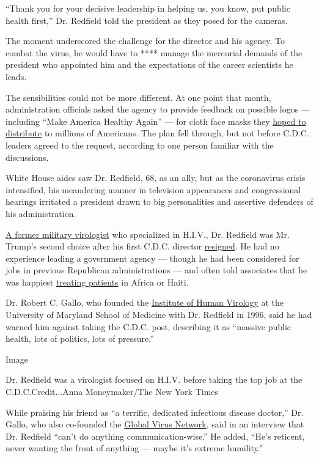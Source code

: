 ``Thank you for your decisive leadership in helping us, you know, put
public health first,'' Dr. Redfield told the president as they posed for
the cameras.

The moment underscored the challenge for the director and his agency. To
combat the virus, he would have to **** manage the mercurial demands of
the president who appointed him and the expectations of the career
scientists he leads.

The sensibilities could not be more different. At one point that month,
administration officials asked the agency to provide feedback on
possible logos --- including ``Make America Healthy Again'' --- for
cloth face masks they
\href{https://www.axios.com/hanes-face-masks-white-house-a09a360f-4d52-4c08-baee-4a85e1f6562f.html}{hoped
to distribute} to millions of Americans. The plan fell through, but not
before C.D.C. leaders agreed to the request, according to one person
familiar with the discussions.

White House aides saw Dr. Redfield, 68, as an ally, but as the
coronavirus crisis intensified, his meandering manner in television
appearances and congressional hearings irritated a president drawn to
big personalities and assertive defenders of his administration.

\href{https://www.hhs.gov/about/leadership/robert-redfield/index.html}{A
former military virologist} who specialized in H.I.V., Dr. Redfield was
Mr. Trump's second choice after his first C.D.C. director
\href{https://www.nytimes3xbfgragh.onion/2018/01/31/health/cdc-brenda-fitzgerald-resigns.html}{resigned}.
He had no experience leading a government agency --- though he had been
considered for jobs in previous Republican administrations --- and often
told associates that he was happiest
\href{http://www.ihv.org/media/SOM/Microsites/IHV/documents/Discovery-Newsletter/Discovery_Winter_2010.pdf}{treating
patients} in Africa or Haiti.

Dr. Robert C. Gallo, who founded the
\href{http://www.ihv.org/about/About-Dr-Robert-C-Gallo/}{Institute of
Human Virology} at the University of Maryland School of Medicine with
Dr. Redfield in 1996, said he had warned him against taking the C.D.C.
post, describing it as ``massive public health, lots of politics, lots
of pressure.''

Image

Dr. Redfield was a virologist focused on H.I.V. before taking the top
job at the C.D.C.Credit...Anna Moneymaker/The New York Times

While praising his friend as ``a terrific, dedicated infectious disease
doctor,'' Dr. Gallo, who also co-founded the
\href{https://gvn.org/}{Global Virus Network}, said in an interview that
Dr. Redfield ``can't do anything communication-wise.'' He added, ``He's
reticent, never wanting the front of anything --- maybe it's extreme
humility.''

